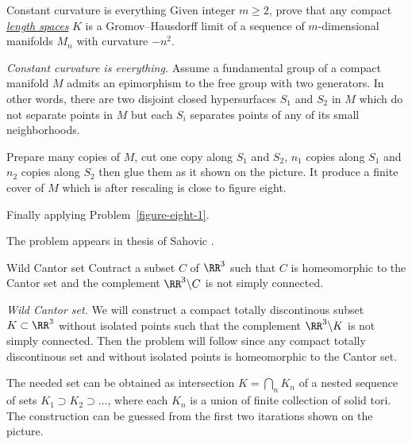 \begin{pr}{\thm}{Constant curvature is everything}\label{figure-eight-2} Given integer $m\ge 2$, prove that any compact \hyperref[Length space]{\emph{length spaces}} $K$ is a Gromov--Hausdorff limit of a sequence of $m$-dimensional
manifolds $M_n$ with curvature $-n^2$.
\end{pr}

\textit{Constant curvature is everything.}
Assume a fundamental group of a compact manifold $M$ admits an epimorphism to the free group with two generators.
In other words, there are two disjoint closed hypersurfaces $S_1$ and $S_2$ in $M$ 
which do not separate points in $M$
but each $S_i$ separates points of any of its small neighborhoods.

Prepare many copies of $M$, cut one copy along $S_1$ and $S_2$,
$n_1$ copies along $S_1$ and $n_2$ copies along $S_2$
then glue them as it shown on the picture. 
It produce a finite cover of $M$ which is after rescaling is close to figure eight.

Finally applying Problem~\ref{figure-eight-1}.

 The problem appears in thesis of Sahovic \cite{sahovic}.



















\begin{pr}{}{Wild Cantor set}\label{Wild Cantor set} 
Contract a subset $C$ of $\RR^3$ 
such that $C$ is homeomorphic to the Cantor set and the complement $\RR^3\backslash C$ is not simply connected.
\end{pr}



\textit{Wild Cantor set.}
We will construct a compact totally discontinous subset $K\subset\RR^3$ without isolated points  
such that the complement $\RR^3\backslash K$ is not simply connected.
Then the problem will follow
since any compact totally discontinous set and without isolated points
is homeomorphic to the Cantor set.

The needed set can be obtained as intersection $K=\bigcap_n K_n$
of a nested sequence 
of sets $K_1\supset K_2\supset\dots$, where each $K_n$ is a union of finite collection of solid tori. 
The construction can be guessed from the first two itarations shown on the picture.

